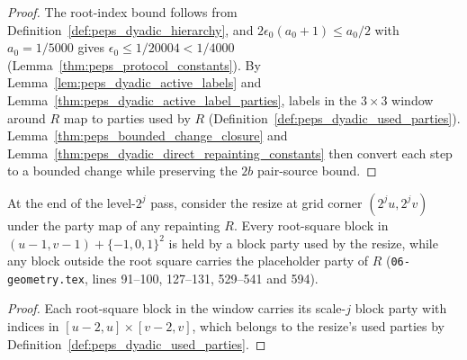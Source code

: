 \begin{proof}\leanok
    The root-index bound follows from Definition~\ref{def:peps_dyadic_hierarchy}, and $2\epsilon_0(a_0+1)\le a_0/2$ with $a_0=1/5000$ gives $\epsilon_0\le 1/20004<1/4000$ (Lemma~\ref{thm:peps_protocol_constants}). By Lemma~\ref{lem:peps_dyadic_active_labels} and Lemma~\ref{thm:peps_dyadic_active_label_parties}, labels in the $3\times3$ window around $R$ map to parties used by $R$ (Definition~\ref{def:peps_dyadic_used_parties}). Lemma~\ref{thm:peps_bounded_change_closure} and Lemma~\ref{thm:peps_dyadic_direct_repainting_constants} then convert each step to a bounded change while preserving the $2b$ pair-source bound.
\end{proof}

\begin{lemma}
    \label{lem:peps_protocol_junction_resize_parties}
    \leanok
    At the end of the level-$2^j$ pass, consider the resize at grid corner $(2^ju,2^jv)$ under the party map of any repainting $R$. Every root-square block in $(u-1,v-1)+\{-1,0,1\}^2$ is held by a block party used by the resize, while any block outside the root square carries the placeholder party of $R$ (\texttt{06-geometry.tex}, lines 91--100, 127--131, 529--541 and 594).
\end{lemma}

\begin{proof}\leanok
    Each root-square block in the window carries its scale-$j$ block party with indices in $[u-2,u]\times[v-2,v]$, which belongs to the resize's used parties by Definition~\ref{def:peps_dyadic_used_parties}.
\end{proof}

